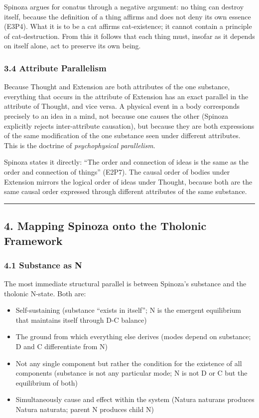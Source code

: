 \documentclass[
  11pt,
  letterpaper,
]{article}
\providecommand{\tightlist}{%
  \setlength{\itemsep}{0pt}\setlength{\parskip}{0pt}}
\begin{document}
Spinoza argues for conatus through a negative argument: no thing can
destroy itself, because the definition of a thing affirms and does not
deny its own essence (E3P4). What it is to be a cat affirms
cat-existence; it cannot contain a principle of cat-destruction. From
this it follows that each thing must, insofar as it depends on itself
alone, act to preserve its own being.

\subsubsection{3.4 Attribute Parallelism}\label{attribute-parallelism}

Because Thought and Extension are both attributes of the one substance,
everything that occurs in the attribute of Extension has an exact
parallel in the attribute of Thought, and vice versa. A physical event
in a body corresponds precisely to an idea in a mind, not because one
causes the other (Spinoza explicitly rejects inter-attribute causation),
but because they are both expressions of the same modification of the
one substance seen under different attributes. This is the doctrine of
\emph{psychophysical parallelism}.

Spinoza states it directly: ``The order and connection of ideas is the
same as the order and connection of things'' (E2P7). The causal order of
bodies under Extension mirrors the logical order of ideas under Thought,
because both are the same causal order expressed through different
attributes of the same substance.

\begin{center}\rule{0.5\linewidth}{0.5pt}\end{center}

\subsection{4. Mapping Spinoza onto the Tholonic
Framework}\label{mapping-spinoza-onto-the-tholonic-framework}

\subsubsection{4.1 Substance as N}\label{substance-as-n}

The most immediate structural parallel is between Spinoza's substance
and the tholonic N-state. Both are:

\begin{itemize}
\tightlist
\item
  Self-sustaining (substance ``exists in itself''; N is the emergent
  equilibrium that maintains itself through D-C balance)
\item
  The ground from which everything else derives (modes depend on
  substance; D and C differentiate from N)
\item
  Not any single component but rather the condition for the existence of
  all components (substance is not any particular mode; N is not D or C
  but the equilibrium of both)
\item
  Simultaneously cause and effect within the system (Natura naturans
  produces Natura naturata; parent N produces child N)
\end{itemize}
\end{document}
